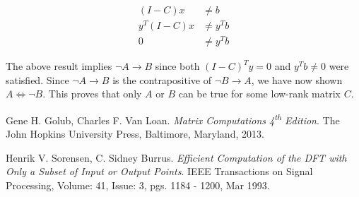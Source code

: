 \documentclass{article}[11pt]
\begin{document}
   \begin{align*}
   (I-C)x &\neq b \\
   y^T(I-C)x & \neq y^Tb  \\
   0 &\neq  y^Tb
   \end{align*}
   
   The above result implies $\neg  A \rightarrow B$ since both $(I-C)^Ty = 0$ and $y^Tb \neq 0$ were satisfied. Since $\neg A \rightarrow B$ is the contrapositive of $\neg B \rightarrow A$, we have now shown $ A \iff \neg B$. This proves that only $A$ or $B$ can be true for some low-rank matrix $C$.
   
   
   
\begin{thebibliography}{9}
Gene H. Golub, Charles F. Van Loan. 
\textit{Matrix Computations 4\textsuperscript{th} Edition}. 
The John Hopkins University Press, Baltimore, Maryland, 2013.
 
Henrik V. Sorensen, C. Sidney Burrus.
\textit{Efficient Computation of the DFT with Only a Subset of Input or Output Points}.
IEEE Transactions on Signal Processing, Volume: 41, Issue: 3, pgs. 1184 - 1200, Mar 1993.
\end{thebibliography}
\end{document}
